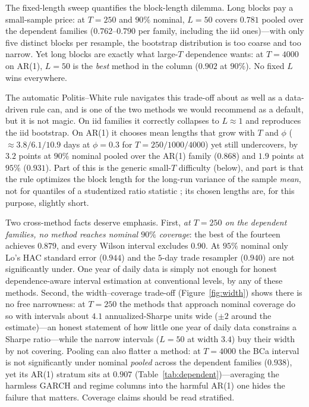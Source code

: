 \documentclass[11pt]{article}
\begin{document}
The fixed-length sweep quantifies the block-length dilemma. Long blocks pay a
small-sample price: at $T=250$ and $90\%$ nominal, $L=50$ covers
$0.781$ pooled over the dependent families ($0.762$--$0.790$ per family,
including the iid ones)---with only five distinct blocks per resample, the
bootstrap distribution is too coarse and too narrow. Yet long blocks are
exactly what large-$T$ dependence wants: at $T=4000$ on AR(1), $L=50$ is the
\emph{best} method in the column ($0.902$ at $90\%$). No fixed $L$ wins
everywhere.

The automatic Politis--White rule navigates this trade-off about as well as a
data-driven rule can, and is one of the two methods we would recommend as a
default, but it is not magic. On iid families it correctly collapses to
$L\approx 1$ and reproduces the iid bootstrap. On AR(1) it chooses mean
lengths that grow with $T$ and $\phi$ ($\approx 3.8/6.1/10.9$ days at
$\phi=0.3$ for $T=250/1000/4000$) yet still undercovers, by $3.2$ points at
$90\%$ nominal pooled over the AR(1) family ($0.868$) and $1.9$ points at
$95\%$ ($0.931$). Part of this is the generic small-$T$ difficulty (below),
and part is that the rule optimizes the block length for the long-run variance
of the sample \emph{mean}, not for quantiles of a studentized ratio statistic
\citep{hall1995blocking,politis2004automatic}; its chosen lengths are, for
this purpose, slightly short.

Two cross-method facts deserve emphasis. First, \emph{at $T=250$ on the
dependent families, no method reaches nominal $90\%$ coverage}: the best of
the fourteen achieves $0.879$, and every Wilson interval excludes $0.90$. At
$95\%$ nominal only Lo's HAC standard error ($0.944$) and the $5$-day trade
resampler ($0.940$) are not significantly under. One year of daily data is
simply not enough for honest dependence-aware interval estimation at
conventional levels, by any of these methods. Second, the width--coverage
trade-off (Figure~\ref{fig:width}) shows there is no free narrowness: at
$T=250$ the methods that approach nominal coverage do so with intervals about
$4.1$ annualized-Sharpe units wide ($\pm 2$ around the estimate)---an honest
statement of how little one year of daily data constrains a Sharpe
ratio---while the narrow intervals ($L=50$ at width $3.4$) buy their width by
not covering. Pooling can also flatter a method: at $T=4000$ the BCa interval
is not significantly under nominal \emph{pooled} across the dependent families
($0.938$), yet its AR(1) stratum sits at $0.907$
(Table~\ref{tab:dependent})---averaging the harmless GARCH and regime columns
into the harmful AR(1) one hides the failure that matters. Coverage claims
should be read stratified.
\end{document}
